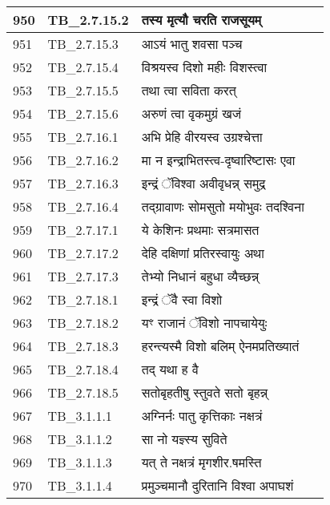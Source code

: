 \documentclass[17pt]{extarticle}
\begin{document}
\begin{longtable}{||p{0.4in}||p{0.9in}||p{4.0in}||p{0.9in}||}
        \hline
            950 & TB\_2.7.15.2 & तस्य मृत्यौ चरति राजसूयम् &      \\
        \hline
            951 & TB\_2.7.15.3 & आऽयं भातु शवसा पञ्च &      \\
        \hline
            952 & TB\_2.7.15.4 & विश्रयस्व दिशो महीः विशस्त्वा &      \\
        \hline
            953 & TB\_2.7.15.5 & तथा त्वा सविता करत् &      \\
        \hline
            954 & TB\_2.7.15.6 & अरुणं त्वा वृकमुग्रं खजं &      \\
        \hline
            955 & TB\_2.7.16.1 & अभि प्रेहि वीरयस्व उग्रश्चेत्ता &      \\
        \hline
            956 & TB\_2.7.16.2 & मा न इन्द्राभितस्त्व{-}दृष्वारिष्टासः एवा &      \\
        \hline
            957 & TB\_2.7.16.3 & इन्द्रं ॅविश्वा अवीवृधन्न् समुद्र &      \\
        \hline
            958 & TB\_2.7.16.4 & तद्ग्रावाणः सोमसुतो मयोभुवः तदश्विना &      \\
        \hline
            959 & TB\_2.7.17.1 & ये केशिनः प्रथमाः सत्रमासत &      \\
        \hline
            960 & TB\_2.7.17.2 & देहि दक्षिणां प्रतिरस्वायुः अथा &      \\
        \hline
            961 & TB\_2.7.17.3 & तेभ्यो निधानं बहुधा व्यैच्छन्न् &      \\
        \hline
            962 & TB\_2.7.18.1 & इन्द्रं ॅवै स्वा विशो &      \\
        \hline
            963 & TB\_2.7.18.2 & यꣳ राजानं ॅविशो नापचायेयुः &      \\
        \hline
            964 & TB\_2.7.18.3 & हरन्त्यस्मै विशो बलिम् ऐनमप्रतिख्यातं &      \\
        \hline
            965 & TB\_2.7.18.4 & तद् यथा ह वै &      \\
        \hline
            966 & TB\_2.7.18.5 & सतोबृहतीषु स्तुवते सतो बृहन्न् &      \\
        \hline
            967 & TB\_3.1.1.1 & अग्निर्नः पातु कृत्तिकाः नक्षत्रं &      \\
        \hline
            968 & TB\_3.1.1.2 & सा नो यज्ञ्स्य सुविते &      \\
        \hline
            969 & TB\_3.1.1.3 & यत् ते नक्षत्रं मृगशीर.षमस्ति &      \\
        \hline
            970 & TB\_3.1.1.4 & प्रमुञ्चमानौ दुरितानि विश्वा अपाघशं &      \\

\end{longtable}
\end{document}

